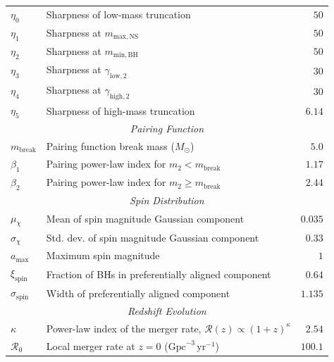 \begin{table}[htb]
\begin{tabular}{llr}
\midrule
$\eta_0$ & Sharpness of low-mass truncation & $50$ \\
$\eta_1$ & Sharpness at $m_{\mathrm{max,NS}}$ & $50$ \\
$\eta_2$ & Sharpness at $m_{\mathrm{min,BH}}$ & $50$ \\
$\eta_3$ & Sharpness at $\gamma_{\mathrm{low},2}$ & $30$ \\
$\eta_4$ & Sharpness at $\gamma_{\mathrm{high},2}$ & $30$ \\
$\eta_5$ & Sharpness of high-mass truncation & $6.14$ \\

\midrule
\multicolumn{3}{c}{\textit{Pairing Function}} \\
\midrule
$m_{\mathrm{break}}$ & Pairing function break mass ($M_\odot$) & $5.0$ \\
$\beta_1$ & Pairing power-law index for $m_2 < m_{\mathrm{break}}$ & $1.17$ \\
$\beta_2$ & Pairing power-law index for $m_2 \geq m_{\mathrm{break}}$ & $2.44$ \\

\midrule
\multicolumn{3}{c}{\textit{Spin Distribution}} \\
\midrule
$\mu_{\chi}$ & Mean of spin magnitude Gaussian component & $0.035$ \\
$\sigma_{\chi}$ & Std. dev. of spin magnitude Gaussian component & $0.33$ \\
$a_{\mathrm{max}}$ & Maximum spin magnitude & $1$ \\
\midrule
$\xi_{\mathrm{spin}}$ & Fraction of BHs in preferentially aligned component & $0.64$ \\
$\sigma_{\mathrm{spin}}$ & Width of preferentially aligned component & $1.135$ \\

\midrule
\multicolumn{3}{c}{\textit{Redshift Evolution}} \\
\midrule
$\kappa$ & Power-law index of the merger rate, $\mathcal{R}(z) \propto (1+z)^{\kappa}$ & $2.54$ \\
$\mathcal{R}_0$ & Local merger rate at $z = 0$ ($\mathrm{Gpc}^{-3}\,\mathrm{yr}^{-1}$) & $100.1$ \\

\bottomrule
\end{tabular}
\end{table}
